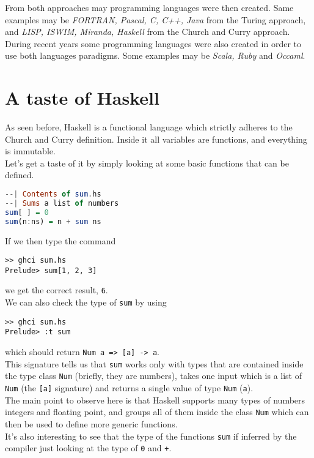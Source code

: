 From both approaches may programming languages were then created. Same examples may be \textit{FORTRAN, Pascal, C, C++, Java} from the Turing approach, and \textit{LISP, ISWIM, Miranda, Haskell} from the Church and Curry approach. \\
During recent years some programming languages were also created in order to use both languages paradigms. Some examples may be \textit{Scala, Ruby} and \textit{Occaml}. \\

\section{A taste of Haskell}
As seen before, Haskell is a functional language which strictly adheres to the Church and Curry definition. Inside it all variables are functions, and everything is immutable. \\
Let's get a taste of it by simply looking at some basic functions that can be defined.

\begin{lstlisting}[language=haskell]
--| Contents of sum.hs
--| Sums a list of numbers
sum[ ] = 0 
sum(n:ns) = n + sum ns
\end{lstlisting}

If we then type the command 

\begin{lstlisting}
>> ghci sum.hs
Prelude> sum[1, 2, 3]
\end{lstlisting}

we get the correct result, \texttt{6}. \\

We can also check the type of \texttt{sum} by using 

\begin{lstlisting}
>> ghci sum.hs
Prelude> :t sum
\end{lstlisting}

which should return \texttt{Num a => [a] -> a}. \\
This signature tells us that \texttt{sum} works only with types that are contained inside the type class \texttt{Num} (briefly, they are numbers), takes one input which is a list of \texttt{Num} (the \texttt{[a]} signature) and returns a single value of type \texttt{Num} (\texttt{a}). \\
The main point to observe here is that Haskell supports many types of numbers integers and floating point, and groups all of them inside the class \texttt{Num} which can then be used to define more generic functions. \\
It's also interesting to see that the type of the functions \texttt{sum} if inferred by the compiler just looking at the type of \texttt{0} and \texttt{+}.
\linebreak \linebreak

